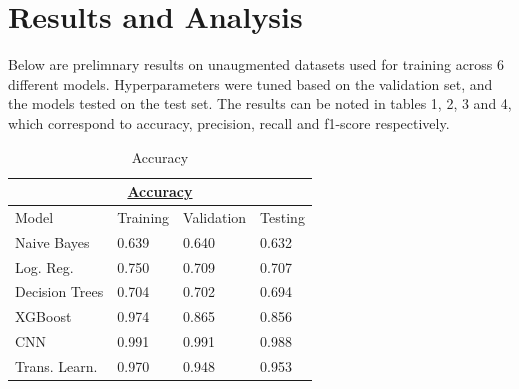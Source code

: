 \documentclass[10pt,twocolumn,letterpaper]{article}
\begin{document}
\section{Results and Analysis}

Below are prelimnary results on unaugmented datasets used for training across 6 different models. Hyperparameters were tuned based on the validation set, and the models tested on the test set. The results can be noted in tables 1, 2, 3 and 4, which correspond to accuracy, precision, recall and f1-score respectively. 


\begin{table}[]
   \begin{tabular}{|llll|}
   \hline
   \multicolumn{4}{|c|}{{\ul \textbf{Accuracy}}}                                                                                  \\ \hline
   \multicolumn{1}{|l|}{Model}                        & \multicolumn{1}{l|}{Training} & \multicolumn{1}{l|}{Validation} & Testing \\ \hline
   \multicolumn{1}{|l|}{Naive Bayes}                  & \multicolumn{1}{l|}{0.639}    & \multicolumn{1}{l|}{0.640}      & 0.632   \\ \hline
   \multicolumn{1}{|l|}{Log. Reg.}          & \multicolumn{1}{l|}{0.750}    & \multicolumn{1}{l|}{0.709}      & 0.707   \\ \hline
   \multicolumn{1}{|l|}{Decision Trees}               & \multicolumn{1}{l|}{0.704}    & \multicolumn{1}{l|}{0.702}      & 0.694   \\ \hline
   \multicolumn{1}{|l|}{XGBoost}                      & \multicolumn{1}{l|}{0.974}    & \multicolumn{1}{l|}{0.865}      & 0.856   \\ \hline
   \multicolumn{1}{|l|}{CNN}                          & \multicolumn{1}{l|}{0.991}    & \multicolumn{1}{l|}{0.991}      & 0.988   \\ \hline
   \multicolumn{1}{|l|}{Trans. Learn.} & \multicolumn{1}{l|}{0.970}    & \multicolumn{1}{l|}{0.948}      & 0.953   \\ \hline
   \end{tabular}

   \caption{Accuracy}
\end{table}
\end{document}
